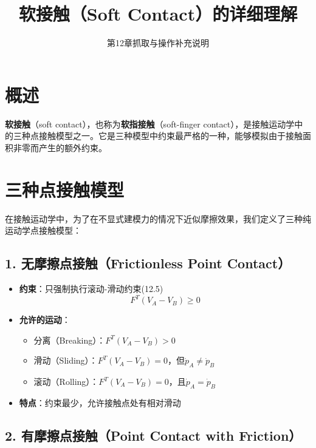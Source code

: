\documentclass[12pt,a4paper]{article}
\title{软接触（Soft Contact）的详细理解}
\author{第12章抓取与操作补充说明}
\date{}
\begin{document}
\maketitle

\section{概述}

\textbf{软接触}（soft contact），也称为\textbf{软指接触}（soft-finger contact），是接触运动学中的三种点接触模型之一。它是三种模型中约束最严格的一种，能够模拟由于接触面积非零而产生的额外约束。

\section{三种点接触模型}

在接触运动学中，为了在不显式建模力的情况下近似摩擦效果，我们定义了三种纯运动学点接触模型：

\subsection{1. 无摩擦点接触（Frictionless Point Contact）}

\begin{itemize}
\item \textbf{约束}：只强制执行滚动-滑动约束(12.5)
  \begin{equation}
  F^T (V_A - V_B) \geq 0
  \end{equation}
\item \textbf{允许的运动}：
  \begin{itemize}
  \item 分离（Breaking）：$F^T (V_A - V_B) > 0$
  \item 滑动（Sliding）：$F^T (V_A - V_B) = 0$，但$\dot{p}_A \neq \dot{p}_B$
  \item 滚动（Rolling）：$F^T (V_A - V_B) = 0$，且$\dot{p}_A = \dot{p}_B$
  \end{itemize}
\item \textbf{特点}：约束最少，允许接触点处有相对滑动
\end{itemize}

\subsection{2. 有摩擦点接触（Point Contact with Friction）}
\end{document}
